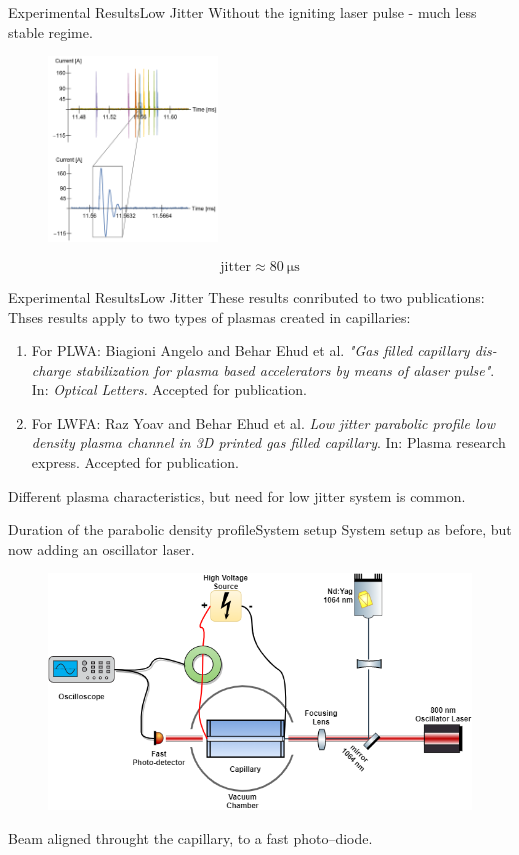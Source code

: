 \documentclass[]{beamer}
\begin{document}
  \begin{frame}{Experimental Results}{Low Jitter}
    Without the igniting laser pulse - much less stable regime.
    \begin{figure}
      \includegraphics[width=0.4\textwidth]{figures/results/high_jitter.png}
    \end{figure}
    $$\text{jitter}\approx \SI{80}{\us}$$
  \end{frame}
  \begin{frame}{Experimental Results}{Low Jitter}
    These results conributed to two publications:
    Thses results apply to two types of plasmas created in capillaries:
    \begin{enumerate}
      \item For PLWA: Biagioni Angelo and Behar Ehud et al. \emph{"Gas filled capillary dis-charge stabilization for plasma based accelerators by means of alaser pulse"}. In: \emph{Optical Letters.} Accepted for publication.
      \item For LWFA: Raz Yoav and Behar Ehud et al. \emph{Low jitter parabolic profile low density plasma channel in 3D printed gas filled capillary}. In: Plasma research express. Accepted for publication.
    \end{enumerate}
    Different plasma characteristics, but need for low jitter system is common.
  \end{frame}
  \begin{frame}{Duration of the parabolic density profile}{System setup}
    System setup as before, but now adding an oscillator laser.
    \begin{figure}
     \includegraphics[width=\textwidth]{figures/results/oscillator/oscillator_system_setup.png} 
    \end{figure}
    Beam aligned throught the capillary, to a fast photo--diode.
  \end{frame}
\end{document}
